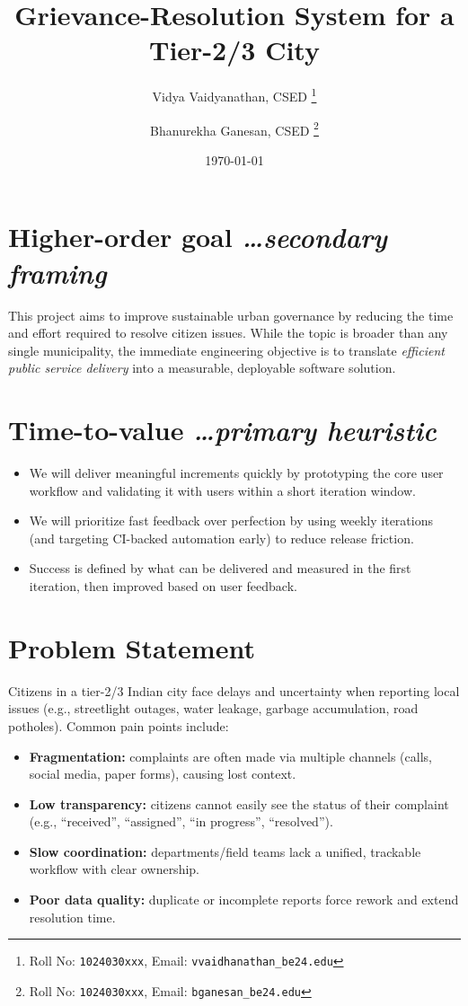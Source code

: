 \documentclass[11pt,a4paper]{article}
\title{Grievance-Resolution System for a Tier-2/3 City}
\author{
  Vidya Vaidyanathan, CSED%
  \thanks{Roll No: \texttt{1024030xxx}, %
    Email: \texttt{vvaidhanathan\_be24\@thapar.edu}}
  \and 
  Bhanurekha Ganesan, CSED%
  \thanks{Roll No: \texttt{1024030xxx}, %
    Email: \texttt{bganesan\_be24\@thapar.edu}}
}
\date{\today}
\newcommand{\BvrHint}[1]{%
  {\normalfont\normalsize\itshape\hfill #1}}
\begin{document}
\maketitle

\section{Higher-order goal%
  \BvrHint{\ldots secondary framing}}
This project aims to improve sustainable urban
governance by reducing the time and effort required to
resolve citizen issues. While the topic is broader than
any single municipality, the immediate engineering
objective is to translate \emph{efficient public
  service delivery} into a measurable, deployable
software solution.

\section{Time-to-value %
\BvrHint{\ldots primary heuristic}}
\begin{itemize}[leftmargin=0.7cm]
    \item We will deliver meaningful increments quickly by prototyping the core user workflow and validating it with users within a short iteration window.
    \item We will prioritize fast feedback over perfection by using weekly iterations (and targeting CI-backed automation early) to reduce release friction.
    \item Success is defined by what can be delivered and measured in the first iteration, then improved based on user feedback.
\end{itemize}

\section{Problem Statement}
Citizens in a tier-2/3 Indian city face delays and uncertainty when reporting local issues (e.g., streetlight outages, water leakage, garbage accumulation, road potholes). Common pain points include:
\begin{itemize}[leftmargin=0.7cm]
    \item \textbf{Fragmentation:} complaints are often made via multiple channels (calls, social media, paper forms), causing lost context.
    \item \textbf{Low transparency:} citizens cannot easily see the status of their complaint (e.g., ``received'', ``assigned'', ``in progress'', ``resolved'').
    \item \textbf{Slow coordination:} departments/field teams lack a unified, trackable workflow with clear ownership.
    \item \textbf{Poor data quality:} duplicate or incomplete reports force rework and extend resolution time.
\end{itemize}
\end{document}

